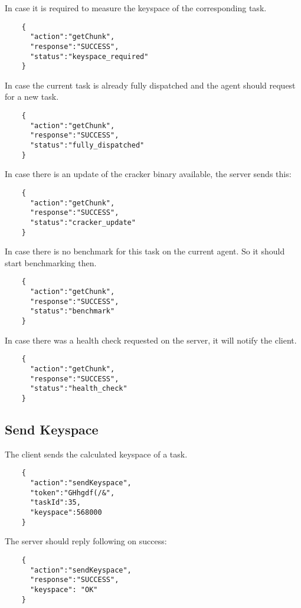 \documentclass{article}
\begin{document}
	In case it is required to measure the keyspace of the corresponding task.
	\begin{verbatim}
	{
	  "action":"getChunk",
	  "response":"SUCCESS",
	  "status":"keyspace_required"
	}
	\end{verbatim}
	
	In case the current task is already fully dispatched and the agent should request for a new task.
	\begin{verbatim}
	{
	  "action":"getChunk",
	  "response":"SUCCESS",
	  "status":"fully_dispatched"
	}
	\end{verbatim}
	
	In case there is an update of the cracker binary available, the server sends this:
	\begin{verbatim}
	{
	  "action":"getChunk",
	  "response":"SUCCESS",
	  "status":"cracker_update"
	}
	\end{verbatim}
	
	In case there is no benchmark for this task on the current agent. So it should start benchmarking then.
	\begin{verbatim}
	{
	  "action":"getChunk",
	  "response":"SUCCESS",
	  "status":"benchmark"
	}
	\end{verbatim}
	
	In case there was a health check requested on the server, it will notify the client.
	\begin{verbatim}
	{
	  "action":"getChunk",
	  "response":"SUCCESS",
	  "status":"health_check"
	}
	\end{verbatim}
	
	
	\subsection*{Send Keyspace}
	The client sends the calculated keyspace of a task.
	\begin{verbatim}
	{
	  "action":"sendKeyspace",
	  "token":"GHhgdf(/&",
	  "taskId":35,
	  "keyspace":568000
	}
	\end{verbatim}
	The server should reply following on success:
	\begin{verbatim}
	{
	  "action":"sendKeyspace",
	  "response":"SUCCESS",
	  "keyspace": "OK"
	}
	\end{verbatim}
	
\end{document}
